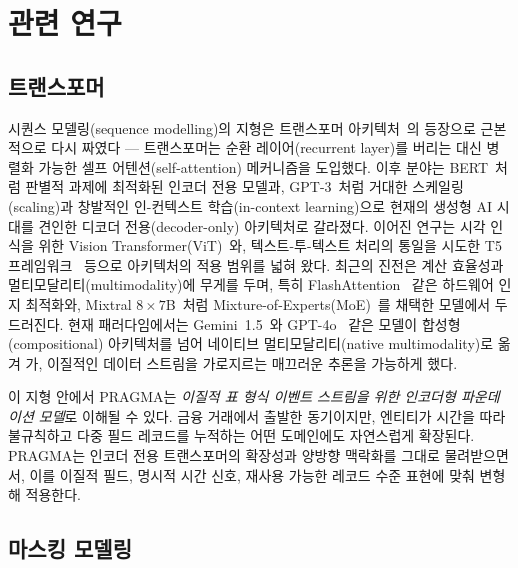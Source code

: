 \section{관련 연구}
\label{sec:related-work}

\subsection{트랜스포머}
\label{sec:rw-transformer}

시퀀스 모델링(sequence modelling)의 지형은 트랜스포머 아키텍처~\citep{vaswani2017attention}의 등장으로 근본적으로 다시 짜였다 — 트랜스포머는 순환 레이어(recurrent layer)를 버리는 대신 병렬화 가능한 셀프 어텐션(self-attention) 메커니즘을 도입했다.
이후 분야는 BERT~\citep{devlin2019bert}처럼 판별적 과제에 최적화된 인코더 전용 모델과, GPT-3~\citep{brown2020language}처럼 거대한 스케일링(scaling)과 창발적인 인-컨텍스트 학습(in-context learning)으로 현재의 생성형 AI 시대를 견인한 디코더 전용(decoder-only) 아키텍처로 갈라졌다.
이어진 연구는 시각 인식을 위한 Vision Transformer(ViT)~\citep{dosovitskiy2021image}와, 텍스트-투-텍스트 처리의 통일을 시도한 T5 프레임워크~\citep{raffel2020exploring} 등으로 아키텍처의 적용 범위를 넓혀 왔다.
최근의 진전은 계산 효율성과 멀티모달리티(multimodality)에 무게를 두며, 특히 FlashAttention~\citep{dao2022flashattention} 같은 하드웨어 인지 최적화와, Mixtral $8{\times}7$B~\citep{jiang2024mixtral}처럼 Mixture-of-Experts(MoE)~\citep{fedus2022switch}를 채택한 모델에서 두드러진다.
현재 패러다임에서는 Gemini~1.5~\citep{gemini2024gemini}와 GPT-4o~\citep{hurst2024gpt} 같은 모델이 합성형(compositional) 아키텍처를 넘어 네이티브 멀티모달리티(native multimodality)로 옮겨 가, 이질적인 데이터 스트림을 가로지르는 매끄러운 추론을 가능하게 했다.

이 지형 안에서 PRAGMA는 \emph{이질적 표 형식 이벤트 스트림을 위한 인코더형 파운데이션 모델}로 이해될 수 있다. 금융 거래에서 출발한 동기이지만, 엔티티가 시간을 따라 불규칙하고 다중 필드 레코드를 누적하는 어떤 도메인에도 자연스럽게 확장된다.
PRAGMA는 인코더 전용 트랜스포머의 확장성과 양방향 맥락화를 그대로 물려받으면서, 이를 이질적 필드, 명시적 시간 신호, 재사용 가능한 레코드 수준 표현에 맞춰 변형해 적용한다.

\subsection{마스킹 모델링}
\label{sec:rw-masked-modelling}

